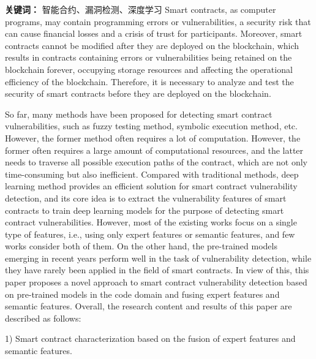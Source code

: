     {\noindent \textbf{关键词：} 智能合约、漏洞检测、深度学习}
\cleardoublepage
{}
Smart contracts, as computer programs, may contain programming errors or vulnerabilities, a security risk that can cause financial losses and a crisis of trust for participants. Moreover, smart contracts cannot be modified after they are deployed on the blockchain, which results in contracts containing errors or vulnerabilities being retained on the blockchain forever, occupying storage resources and affecting the operational efficiency of the blockchain. Therefore, it is necessary to analyze and test the security of smart contracts before they are deployed on the blockchain.

So far, many methods have been proposed for detecting smart contract vulnerabilities, such as fuzzy testing method, symbolic execution method, etc. However, the former method often requires a lot of computation. However, the former often requires a large amount of computational resources, and the latter needs to traverse all possible execution paths of the contract, which are not only time-consuming but also inefficient. Compared with traditional methods, deep learning method provides an efficient solution for smart contract vulnerability detection, and its core idea is to extract the vulnerability features of smart contracts to train deep learning models for the purpose of detecting smart contract vulnerabilities. However, most of the existing works focus on a single type of features, i.e., using only expert features or semantic features, and few works consider both of them. On the other hand, the pre-trained models emerging in recent years perform well in the task of vulnerability detection, while they have rarely been applied in the field of smart contracts. In view of this, this paper proposes a novel approach to smart contract vulnerability detection based on pre-trained models in the code domain and fusing expert features and semantic features. Overall, the research content and results of this paper are described as follows:

    1) Smart contract characterization based on the fusion of expert features and semantic features.

